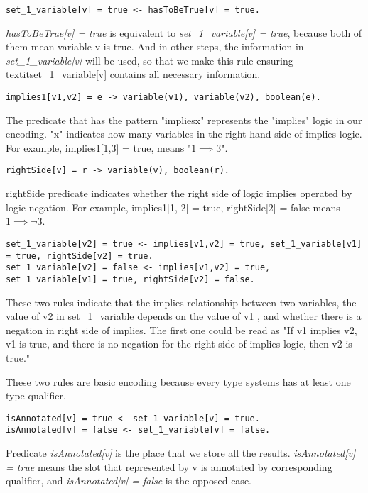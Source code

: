 \documentclass[11pt]{article}
\begin{document}
\begin{lstlisting}
set_1_variable[v] = true <- hasToBeTrue[v] = true.
\end{lstlisting}
\par \textit{hasToBeTrue[v] = true} is equivalent to \textit{set\_1\_variable[v] = true}, because both of them mean variable v is true. And in other steps, the information in \textit{set\_1\_variable[v]} will be used, so that we make this rule ensuring textit{set\_1\_variable[v]} contains all necessary information.

\begin{lstlisting}
implies1[v1,v2] = e -> variable(v1), variable(v2), boolean(e).
\end{lstlisting}
\par The predicate that has the pattern "impliesx" represents the "implies" logic in our encoding. "x" indicates how many variables in the right hand side of implies logic. For example, implies1[1,3] = true, means "$1\implies3$".

\begin{lstlisting}
rightSide[v] = r -> variable(v), boolean(r).
\end{lstlisting}
\par rightSide predicate indicates whether the right side of logic implies operated by logic negation. For example, implies1[1, 2] = true, rightSide[2] = false means $1 \implies\neg3$.

\begin{lstlisting}
set_1_variable[v2] = true <- implies[v1,v2] = true, set_1_variable[v1] = true, rightSide[v2] = true.
set_1_variable[v2] = false <- implies[v1,v2] = true, set_1_variable[v1] = true, rightSide[v2] = false.
\end{lstlisting}
\par These two rules indicate that the implies relationship between two variables, the value of v2 in set\_1\_variable depends on the value of v1 , and whether there is a negation in right side of implies. The first one could be read as "If v1 implies v2, v1 is true, and there is no negation for the right side of implies logic, then v2 is true."
\par These two rules are basic encoding because every type systems has at least one type qualifier.
\begin{lstlisting}
isAnnotated[v] = true <- set_1_variable[v] = true.
isAnnotated[v] = false <- set_1_variable[v] = false.
\end{lstlisting}
\par Predicate \textit{isAnnotated[v]} is the place that we store all the results. \textit{isAnnotated[v] = true} means the slot that represented by v is annotated by corresponding qualifier, and \textit{isAnnotated[v] = false} is the opposed case.
 
\end{document}
